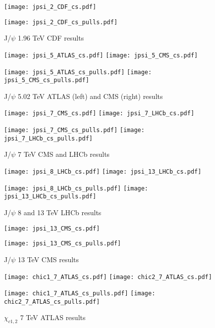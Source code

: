 \documentclass{article}
\begin{document}

\begin{figure}
\centering
\texttt{[image: jpsi\_2\_CDF\_cs.pdf]}

\texttt{[image: jpsi\_2\_CDF\_cs\_pulls.pdf]}
\caption{J/$\psi$ 1.96 TeV CDF results}
\end{figure}

\clearpage

\begin{figure}
\centering
\texttt{[image: jpsi\_5\_ATLAS\_cs.pdf]}
\texttt{[image: jpsi\_5\_CMS\_cs.pdf]}

\texttt{[image: jpsi\_5\_ATLAS\_cs\_pulls.pdf]}
\texttt{[image: jpsi\_5\_CMS\_cs\_pulls.pdf]}
\caption{J/$\psi$ 5.02 TeV ATLAS (left) and CMS (right) results}
\end{figure}

\clearpage

\begin{figure}
\centering
\texttt{[image: jpsi\_7\_CMS\_cs.pdf]}
\texttt{[image: jpsi\_7\_LHCb\_cs.pdf]}

\texttt{[image: jpsi\_7\_CMS\_cs\_pulls.pdf]}
\texttt{[image: jpsi\_7\_LHCb\_cs\_pulls.pdf]}
\caption{J/$\psi$ 7 TeV CMS and LHCb results}
\end{figure}

\clearpage

\begin{figure}
\centering
\texttt{[image: jpsi\_8\_LHCb\_cs.pdf]}
\texttt{[image: jpsi\_13\_LHCb\_cs.pdf]}

\texttt{[image: jpsi\_8\_LHCb\_cs\_pulls.pdf]}
\texttt{[image: jpsi\_13\_LHCb\_cs\_pulls.pdf]}
\caption{J/$\psi$ 8 and 13 TeV LHCb results}
\end{figure}

\clearpage

\begin{figure}
\centering
\texttt{[image: jpsi\_13\_CMS\_cs.pdf]}

\texttt{[image: jpsi\_13\_CMS\_cs\_pulls.pdf]}
\caption{J/$\psi$ 13 TeV CMS results}
\end{figure}

\clearpage

\begin{figure}
\centering
\texttt{[image: chic1\_7\_ATLAS\_cs.pdf]}
\texttt{[image: chic2\_7\_ATLAS\_cs.pdf]}

\texttt{[image: chic1\_7\_ATLAS\_cs\_pulls.pdf]}
\texttt{[image: chic2\_7\_ATLAS\_cs\_pulls.pdf]}
\caption{$\chi_{c1,2}$ 7 TeV ATLAS results}
\end{figure}
\end{document}
